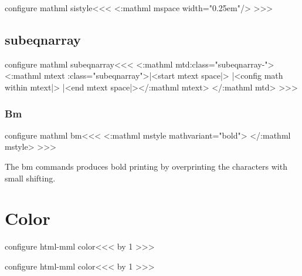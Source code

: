 {{{{{{\<configure mathml sistyle\><<<
  {\ifmathml
     \ifmtext\else \Tg<\a:mathml mspace width="0.25em"/>\fi
   \fi}
>>>


\subsection{subeqnarray}

\<configure mathml subeqnarray\><<<
   {}%
   {}
   {}  {}
   {\Tg<\a:mathml mtd\Hnewline \mml:class="subeqnarray-\HCol">
      \ifnum {}
        \Tg<\a:mathml mtext 
             \mml:class="subeqnarray">|<start mtext space|>\PauseMathClass 
        \mtexttrue
        |<config math within mtext|>%
      \fi}
   {\ifnum {} \mtextfalse 
      \EndPauseMathClass|<end mtext space|>\Tg</\a:mathml mtext>\fi
      \Tg</\a:mathml mtd>}
>>>


\subsubsection{Bm}


\<configure mathml bm\><<<
  {\ifmmode \ifmtext \else
     \Tg<\a:mathml mstyle 
             mathvariant="bold">%
     \expandafter\expandafter\expandafter{}
   \fi\fi}
  {\ifmmode \ifmtext \else \Tg</\a:mathml mstyle>\fi\fi}
>>>


The bm commands produces bold printing by overprinting the characters
with small  shifting.


\section{Color}



\<configure html-mml color\><<<
   {\gHAdvance{} by 1
      {
           {}}%
    }%
   {}
>>>


\<configure html-mml color\><<<
   {\ifmathml
         {
              {}}%
    \else
       \gHAdvance{} by 1
         {
              {}}%
    \fi
   }%
   {}
>>>




}}}}}}

